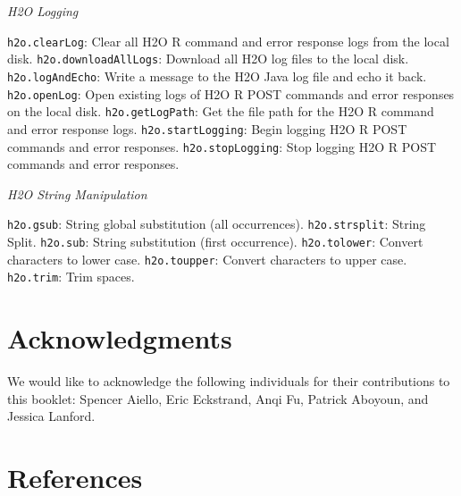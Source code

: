 {{\medskip
\emph{H2O Logging}\par
{\texttt{h2o.clearLog}}: Clear all H2O R command and error response logs from the local disk.
{\texttt{h2o.downloadAllLogs}}: Download all H2O log files to the local disk.
{\texttt{h2o.logAndEcho}}: Write a message to the H2O Java log file and echo it back.
{\texttt{h2o.openLog}}: Open existing logs of H2O R POST commands and error responses on the local disk.
{\texttt{h2o.getLogPath}}: Get the file path for the H2O R command and error response logs.
{\texttt{h2o.startLogging}}: Begin logging H2O R POST commands and error responses.
{\texttt{h2o.stopLogging}}: Stop logging H2O R POST commands and error responses.

\medskip
\emph{H2O String Manipulation}\par
{\texttt{h2o.gsub}}: String global substitution (all occurrences).
{\texttt{h2o.strsplit}}: String Split.
{\texttt{h2o.sub}}: String substitution (first occurrence).
{\texttt{h2o.tolower}}: Convert characters to lower case.
{\texttt{h2o.toupper}}: Convert characters to upper case.
{\texttt{h2o.trim}}: Trim spaces.
}



\section{Acknowledgments}
We would like to acknowledge the following individuals for their contributions to this booklet: Spencer Aiello, Eric Eckstrand, Anqi Fu, Patrick Aboyoun, and Jessica Lanford.

\section{References}





\medskip


\medskip


\medskip


\medskip


\medskip


}
